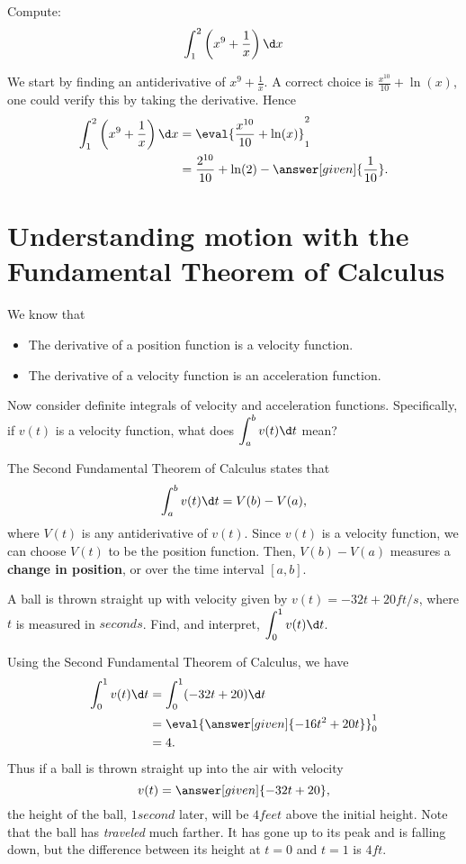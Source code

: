 \documentclass{ximera}
\begin{document}
\begin{example}
	Compute:
	\[ \int_1^2\left(x^9 + \frac{1}{x}\right) \d x \]
	\begin{explanation}
		We start by finding an antiderivative of $x^9 + \frac{1}{x}$.  A
		correct choice is $\frac{x^{10}}{10} + \ln(x)$, one could verify this
		by taking the derivative. Hence
		\begin{align*}
			\int_1^2\left(x^9 + \frac{1}{x}\right) \d x &= \eval{\frac{x^{10}}{10} + \ln(x)}_1^2 \\
				&= \frac{2^{10}}{10} + \ln(2) - \answer[given]{\frac{1}{10}}.
		\end{align*}
	\end{explanation}
\end{example}




\section{Understanding motion with the Fundamental Theorem of Calculus}

We know that
\begin{itemize}
	\item The derivative of a position function is a velocity function.
	\item The derivative of a velocity function is an acceleration  function.
\end{itemize}
Now consider definite integrals of velocity and acceleration
functions. Specifically, if $v(t)$ is a velocity function, what does $\displaystyle \int_a^b v(t)\d t$ mean?

The Second Fundamental Theorem of Calculus states that
\[ \int_a^b v(t)\d t = V(b) - V(a), \]
where $V(t)$ is any antiderivative of $v(t)$. Since $v(t)$ is a
velocity function, we can choose  $V(t)$ to be the position function. Then, $V(b) -
V(a)$ measures a \textbf{change in position}, or  over the time interval $[a,b]$.

\begin{example}
  A ball is thrown straight up with velocity given by $v(t) = -32t+20 \unit{ft/s}$, where $t$ is measured in $\unit{seconds}$. Find, and interpret,
  $\displaystyle \int_0^1 v(t)\d t$.
    \begin{explanation}
      Using the Second Fundamental Theorem of Calculus, we have
      \begin{align*}
        	\int_0^1 v(t)\d t &= \int_0^1 (-32t+20)\d t \\
		&= \eval{\answer[given]{-16t^2 + 20t}}_0^1 \\
		&= 4.
      \end{align*}
      Thus if a ball is thrown straight up into the air with velocity
      \[  v(t) = \answer[given]{-32t+20}, \]
      the height of the ball, $1 \unit{second}$ later, will be $4 \unit{feet}$ above the
      initial height. Note that the ball has \textit{traveled} much
      farther. It has gone up to its peak and is falling down, but the
      difference between its height at $t=0$ and $t=1$ is $4 \unit{ft}$. 
    \end{explanation}
\end{example}    
\end{document}
